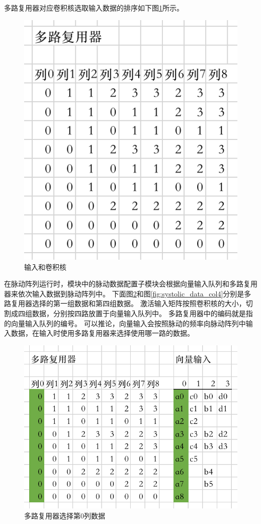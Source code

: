 多路复用器对应卷积核选取输入数据的排序如下图\ref{fig:multiplexor}所示。
\begin{figure}[htbp]
    \centering
    \includegraphics[]{figures/multiplexor.png}
    \caption{输入和卷积核}
    \label{fig:multiplexor}
\end{figure} 

在脉动阵列运行时，模块中的脉动数据配置子模块会根据向量输入队列和多路复用器来依次输入数据到脉动阵列中。
下面图\ref{fig:systolic_data_col0}和图\ref{fig:systolic_data_col4}分别是多路复用器选择的第一组数据和第四组数据。
激活输入矩阵按照卷积核的大小，切割成四组数据，分别按四路放置于向量输入队列中。
多路复用器中的编码就是指的向量输入队列的编号。
可以推论，向量输入会按照脉动的频率向脉动阵列中输入数据，在输入时使用多路复用器来选择使用哪一路的数据。
\begin{figure}[htbp]
    \centering
    \includegraphics[width=12cm]{figures/systolic_data_col0.png}
    \caption{多路复用器选择第0列数据}
    \label{fig:systolic_data_col0}
\end{figure} 

